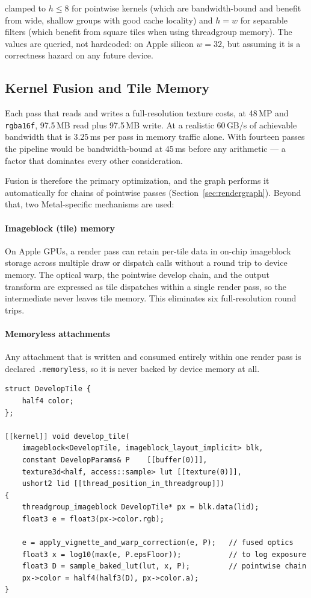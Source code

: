 clamped to $h \leq 8$ for pointwise kernels (which are bandwidth-bound and
benefit from wide, shallow groups with good cache locality) and $h = w$ for
separable filters (which benefit from square tiles when using threadgroup
memory). The values are queried, not hardcoded: on Apple silicon $w = 32$, but
assuming it is a correctness hazard on any future device.

\subsection{Kernel Fusion and Tile Memory}

Each pass that reads and writes a full-resolution texture costs, at 48\,MP and
\texttt{rgba16f}, 97.5\,MB read plus 97.5\,MB write. At a realistic 60\,GB/s of
achievable bandwidth that is 3.25\,ms per pass in memory traffic alone. With
fourteen passes the pipeline would be bandwidth-bound at 45\,ms before any
arithmetic --- a factor that dominates every other consideration.

Fusion is therefore the primary optimization, and the graph performs it
automatically for chains of pointwise passes (Section~\ref{sec:rendergraph}).
Beyond that, two Metal-specific mechanisms are used:

\paragraph{Imageblock (tile) memory} On Apple GPUs, a render pass can retain
per-tile data in on-chip imageblock storage across multiple draw or dispatch
calls without a round trip to device memory. The optical warp, the pointwise
develop chain, and the output transform are expressed as tile dispatches within
a single render pass, so the intermediate never leaves tile memory. This
eliminates six full-resolution round trips.

\paragraph{Memoryless attachments} Any attachment that is written and consumed
entirely within one render pass is declared \texttt{.memoryless}, so it is never
backed by device memory at all.

\begin{lstlisting}[language=Metal, caption={Fused pointwise develop chain as a tile dispatch.}]
struct DevelopTile {
    half4 color;
};

[[kernel]] void develop_tile(
    imageblock<DevelopTile, imageblock_layout_implicit> blk,
    constant DevelopParams& P    [[buffer(0)]],
    texture3d<half, access::sample> lut [[texture(0)]],
    ushort2 lid [[thread_position_in_threadgroup]])
{
    threadgroup_imageblock DevelopTile* px = blk.data(lid);
    float3 e = float3(px->color.rgb);

    e = apply_vignette_and_warp_correction(e, P);   // fused optics
    float3 x = log10(max(e, P.epsFloor));           // to log exposure
    float3 D = sample_baked_lut(lut, x, P);         // pointwise chain
    px->color = half4(half3(D), px->color.a);
}
\end{lstlisting}


